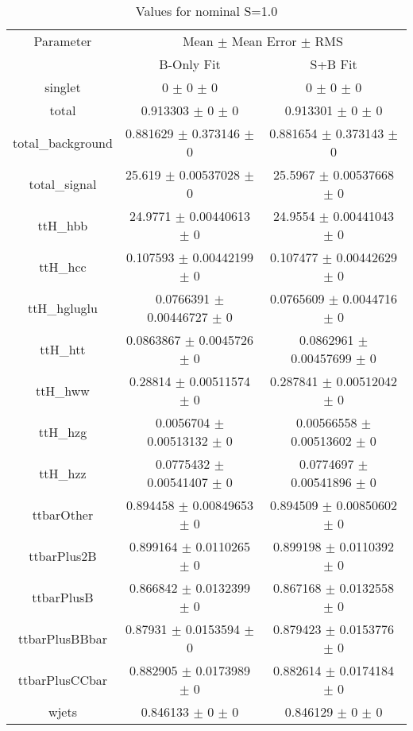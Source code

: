 \begin{table}
\centering
\caption{Values for nominal S=1.0}
\begin{tabular}{ccc}
\toprule
Parameter & \multicolumn{2}{c}{Mean $\pm$ Mean Error $\pm$ RMS}\\
 & B-Only Fit & S+B Fit\\
\midrule
singlet & \num{0} $\pm$ \num{0} $\pm$ \num{0} & \num{0} $\pm$ \num{0} $\pm$ \num{0}\\
total & \num{0.913303} $\pm$ \num{0} $\pm$ \num{0} & \num{0.913301} $\pm$ \num{0} $\pm$ \num{0}\\
total\_background & \num{0.881629} $\pm$ \num{0.373146} $\pm$ \num{0} & \num{0.881654} $\pm$ \num{0.373143} $\pm$ \num{0}\\
total\_signal & \num{25.619} $\pm$ \num{0.00537028} $\pm$ \num{0} & \num{25.5967} $\pm$ \num{0.00537668} $\pm$ \num{0}\\
ttH\_hbb & \num{24.9771} $\pm$ \num{0.00440613} $\pm$ \num{0} & \num{24.9554} $\pm$ \num{0.00441043} $\pm$ \num{0}\\
ttH\_hcc & \num{0.107593} $\pm$ \num{0.00442199} $\pm$ \num{0} & \num{0.107477} $\pm$ \num{0.00442629} $\pm$ \num{0}\\
ttH\_hgluglu & \num{0.0766391} $\pm$ \num{0.00446727} $\pm$ \num{0} & \num{0.0765609} $\pm$ \num{0.0044716} $\pm$ \num{0}\\
ttH\_htt & \num{0.0863867} $\pm$ \num{0.0045726} $\pm$ \num{0} & \num{0.0862961} $\pm$ \num{0.00457699} $\pm$ \num{0}\\
ttH\_hww & \num{0.28814} $\pm$ \num{0.00511574} $\pm$ \num{0} & \num{0.287841} $\pm$ \num{0.00512042} $\pm$ \num{0}\\
ttH\_hzg & \num{0.0056704} $\pm$ \num{0.00513132} $\pm$ \num{0} & \num{0.00566558} $\pm$ \num{0.00513602} $\pm$ \num{0}\\
ttH\_hzz & \num{0.0775432} $\pm$ \num{0.00541407} $\pm$ \num{0} & \num{0.0774697} $\pm$ \num{0.00541896} $\pm$ \num{0}\\
ttbarOther & \num{0.894458} $\pm$ \num{0.00849653} $\pm$ \num{0} & \num{0.894509} $\pm$ \num{0.00850602} $\pm$ \num{0}\\
ttbarPlus2B & \num{0.899164} $\pm$ \num{0.0110265} $\pm$ \num{0} & \num{0.899198} $\pm$ \num{0.0110392} $\pm$ \num{0}\\
ttbarPlusB & \num{0.866842} $\pm$ \num{0.0132399} $\pm$ \num{0} & \num{0.867168} $\pm$ \num{0.0132558} $\pm$ \num{0}\\
ttbarPlusBBbar & \num{0.87931} $\pm$ \num{0.0153594} $\pm$ \num{0} & \num{0.879423} $\pm$ \num{0.0153776} $\pm$ \num{0}\\
ttbarPlusCCbar & \num{0.882905} $\pm$ \num{0.0173989} $\pm$ \num{0} & \num{0.882614} $\pm$ \num{0.0174184} $\pm$ \num{0}\\
wjets & \num{0.846133} $\pm$ \num{0} $\pm$ \num{0} & \num{0.846129} $\pm$ \num{0} $\pm$ \num{0}\\
\bottomrule
\end{tabular}
\end{table}
